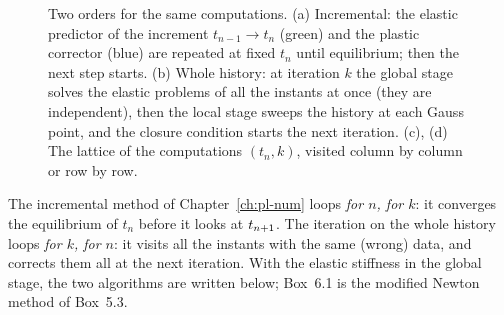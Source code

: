 \begin{figure}[h]
\caption{Two orders for the same computations. (a) Incremental: the elastic
predictor of the increment $t_{n-1}\to t_n$ (green) and the plastic corrector
(blue) are repeated at fixed $t_n$ until equilibrium; then the next step
starts. (b) Whole history: at iteration $k$ the global stage solves the
elastic problems of all the instants at once (they are independent), then
the local stage sweeps the history at each Gauss point, and the closure
condition starts the next iteration. (c), (d) The lattice of the computations
$(t_n,k)$, visited column by column or row by row.}
\label{fig:cy-orders}
\end{figure}

The incremental method of Chapter~\ref{ch:pl-num} loops \emph{for $n$, for
$k$}: it converges the equilibrium of $t_n$ before it looks at $t_{n+1}$. The
iteration on the whole history loops \emph{for $k$, for $n$}: it visits all
the instants with the same (wrong) data, and corrects them all at the next
iteration. With the elastic stiffness in the global stage, the two
algorithms are written below; Box~6.1 is the modified
Newton method of Box~5.3.

